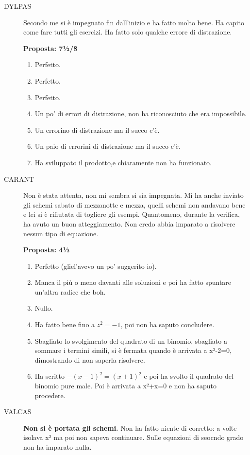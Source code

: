 \documentclass[11pt]{report}
\begin{document}
\begin{description}

\item[DYLPAS] Secondo me si è impegnato fin dall'inizio e ha fatto molto bene. Ha capito come fare tutti gli esercizi. Ha fatto solo qualche errore di distrazione.

\textbf{Proposta: 7½/8}
\begin{enumerate}
    \item Perfetto.
    \item Perfetto.
    \item Perfetto.
    \item Un po' di errori di distrazione, non ha riconosciuto che era impossibile.
    \item Un errorino di distrazione ma il succo c'è.
    \item Un paio di errorini di distrazione ma il succo c'è.
    \item Ha sviluppato il prodotto,e chiaramente non ha funzionato.
\end{enumerate}

\item[CARANT] Non è stata attenta, non mi sembra si sia impegnata. Mi ha anche inviato gli schemi sabato di mezzanotte e mezza, quelli schemi non andavano bene e lei si è rifiutata di togliere gli esempi. Quantomeno, durante la verifica, ha avuto un buon atteggiamento. Non credo abbia imparato a risolvere nessun tipo di equazione.

\textbf{Proposta: 4½}

\begin{enumerate}
    \item Perfetto (gliel'avevo un po' suggerito io).
    \item Manca il più o meno davanti alle soluzioni e poi ha fatto spuntare un'altra radice che boh.
    \item Nullo.
    \item Ha fatto bene fino a $z^2=-1$, poi non ha saputo concludere.
    \item Sbagliato lo svolgimento del quadrato di un binomio, sbagliato a sommare i termini simili, si è fermata quando è arrivata a x²-2=0, dimostrando di non saperla risolvere.
    \item Ha scritto $-(x-1)^2=(x+1)^2$ e poi ha svolto il quadrato del binomio pure male. Poi è arrivata a x²+x=0 e non ha saputo procedere.
\end{enumerate}

\item[VALCAS] \textbf{Non si è portata gli schemi.} Non ha fatto niente di corretto: a volte isolava x² ma poi non sapeva continuare. Sulle equazioni di seocndo grado non ha imparato nulla. 


\end{description}
\end{document}
